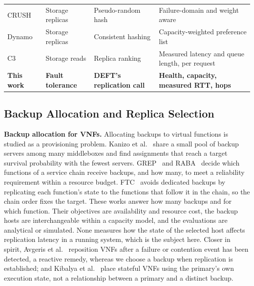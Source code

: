 \documentclass[journal]{IEEEtran}
\begin{document}
\begin{table}[t]
{\begin{tabular}{llll}
\midrule
CRUSH~\cite{weil2006crush} & Storage replicas & Pseudo-random hash & Failure-domain and weight aware \\
Dynamo~\cite{decandia2007dynamo} & Storage replicas & Consistent hashing & Capacity-weighted preference list \\
C3~\cite{suresh2015c3} & Storage reads & Replica ranking & Measured latency and queue length, per request \\
\midrule
\textbf{This work} & \textbf{Fault tolerance} & \textbf{DEFT's replication call} & \textbf{Health, capacity, measured RTT, hops} \\
\bottomrule
\end{tabular}}
\end{table}

\subsection{Backup Allocation and Replica Selection}
\label{sec:related-backup}

\textbf{Backup allocation for VNFs.} Allocating backups to virtual functions is
studied as a provisioning problem. Kanizo et al.~\cite{kanizo2017optimizing}
share a small pool of backup servers among many middleboxes and find assignments
that reach a target survival probability with the fewest servers.
GREP~\cite{fan2015grep} and RABA~\cite{zhang2019raba} decide which functions of
a service chain receive backups, and how many, to meet a reliability requirement
within a resource budget. FTC~\cite{ghaznavi2020ftc} avoids dedicated backups by
replicating each function's state to the functions that follow it in the chain,
so the chain order fixes the target. These works answer how many backups and for
which function. Their objectives are availability and resource cost, the backup
hosts are interchangeable within a capacity model, and the evaluations are
analytical or simulated. None measures how the state of the selected host
affects replication latency in a running system, which is the subject here.
Closer in spirit, Avgeris et al.~\cite{avgeris2023reinforcement} reposition VNFs
after a failure or contention event has been detected, a reactive remedy,
whereas we choose a backup when replication is established; and Kibalya et
al.~\cite{kibalya2021reinforcement} place stateful VNFs using the primary's own
execution state, not a relationship between a primary and a distinct backup.
\end{document}
